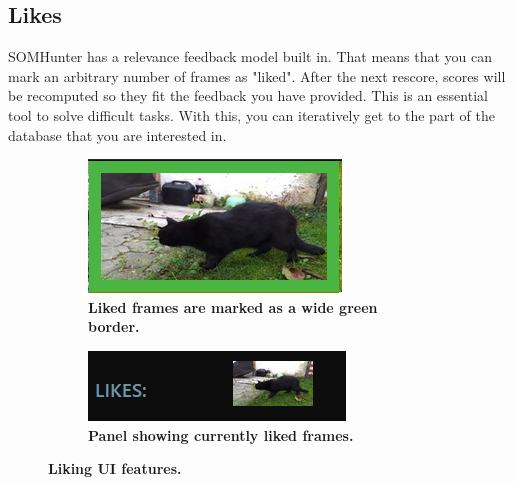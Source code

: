 \subsection{Likes}

SOMHunter has a relevance feedback model built in. That means that you can mark an arbitrary number of frames as "liked". After the next rescore, scores will be recomputed so they fit the feedback you have provided. This is an essential tool to solve difficult tasks. With this, you can iteratively get to the part of the database that you are interested in.

\begin{figure}[h]
	\centering
  \begin{subfigure}[b]{0.4\textwidth}
      \centering
      \includegraphics[width=\textwidth]{img/liked-frame.png}
      \caption{\textbf{Liked frames are marked as a wide green border.}}
      \label{fig:likes-a}
  \end{subfigure}
  \hfill
  \begin{subfigure}[b]{0.55\textwidth}
      \centering
      \includegraphics[width=\textwidth]{img/likes-panel.png}
      \caption{\textbf{Panel showing currently liked frames.}}
      \label{fig:likes-b}
  \end{subfigure}
	
  \caption{\textbf{Liking UI features.}}
	
\end{figure}

